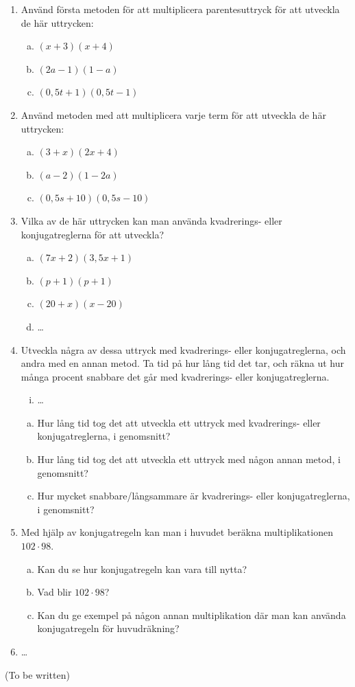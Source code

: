 \begin{enumerate}
  \item Använd första metoden för att multiplicera parentesuttryck för att utveckla de här uttrycken:
  \begin{enumerate}[a)]
    \item $(x+3)(x+4)$
    \item $(2a-1)(1-a)$
    \item $(0{,}5t+1)(0{,}5t-1)$
  \end{enumerate}
  \item Använd metoden med att multiplicera varje term för att utveckla de här uttrycken:
  \begin{enumerate}[a)]
    \item $(3+x)(2x+4)$
    \item $(a-2)(1-2a)$
    \item $(0{,}5s+10)(0{,}5s-10)$
  \end{enumerate}
  \item Vilka av de här uttrycken kan man använda kvadrerings- eller konjugatreglerna för att utveckla?
  \begin{enumerate}[a)]
    \item $(7x+2)(3{,}5x+1)$
    \item $(p+1)(p+1)$
    \item $(20+x)(x-20)$
    \item \ldots
  \end{enumerate}
  \item Utveckla några av dessa uttryck med kvadrerings- eller konjugatreglerna, och andra med en annan metod.
  Ta tid på hur lång tid det tar, och räkna ut hur många procent snabbare det går med kvadrerings- eller konjugatreglerna.
  \begin{enumerate}[i)]
    \item \ldots
  \end{enumerate}
  \begin{enumerate}[a)]
    \item Hur lång tid tog det att utveckla ett uttryck med kvadrerings- eller konjugatreglerna, i genomsnitt?
    \item Hur lång tid tog det att utveckla ett uttryck med någon annan metod, i genomsnitt?
    \item Hur mycket snabbare/långsammare är kvadrerings- eller konjugatreglerna, i genomsnitt?
  \end{enumerate}
  \item Med hjälp av konjugatregeln kan man i huvudet beräkna multiplikationen $102 \cdot 98$.
  \begin{enumerate}[a)]
    \item Kan du se hur konjugatregeln kan vara till nytta?
    \item Vad blir $102 \cdot 98$?
    \item Kan du ge exempel på någon annan multiplikation där man kan använda konjugatregeln för huvudräkning?
  \end{enumerate}
  \item \ldots
  
\end{enumerate}

(To be written)
